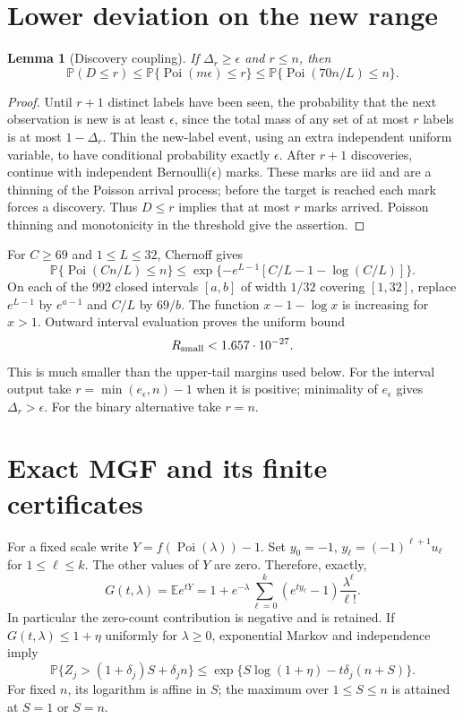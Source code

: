 \documentclass[11pt]{article}
\newtheorem{lemma}{Lemma}
\newcommand{\E}{\mathbb E}
\newcommand{\Prb}{\mathbb P}
\newcommand{\Poi}{\operatorname{Poi}}
\begin{document}
\section{Lower deviation on the new range}
\begin{lemma}[Discovery coupling]\label{lem:discovery}
If $\Delta_r\ge\epsilon$ and $r\le n$, then
\[
 \Prb(D\le r)\le\Prb\{\Poi(m\epsilon)\le r\}
                 \le\Prb\{\Poi(70n/L)\le n\}.
\]
\end{lemma}
\begin{proof}
Until $r+1$ distinct labels have been seen, the probability that the next
observation is new is at least $\epsilon$, since the total mass of any
set of at most $r$ labels is at most $1-\Delta_r$.
Thin the new-label event, using an extra independent uniform variable,
to have conditional probability exactly $\epsilon$. After $r+1$
discoveries, continue with independent Bernoulli($\epsilon$) marks.
These marks are iid and are a thinning of the Poisson arrival process;
before the target is reached each mark forces a discovery.
Thus $D\le r$ implies that at most $r$ marks arrived. Poisson thinning
and monotonicity in the threshold give the assertion.
\end{proof}
For $C\ge69$ and $1\le L\le32$, Chernoff gives
\[
 \Prb\{\Poi(Cn/L)\le n\}
 \le\exp\{-e^{L-1}[C/L-1-\log(C/L)]\}.
\]
On each of the 992 closed intervals $[a,b]$ of width $1/32$ covering
$[1,32]$, replace $e^{L-1}$ by $e^{a-1}$ and $C/L$ by $69/b$.
The function $x-1-\log x$ is increasing for $x>1$.
Outward interval evaluation proves the uniform bound
\begin{equation}\label{eq:lower}
 R_{\rm small}<1.657\cdot10^{-27}.
\end{equation}
This is much smaller than the upper-tail margins used below. For the
interval output take $r=\min(e_\epsilon,n)-1$ when it is positive;
minimality of $e_\epsilon$ gives $\Delta_r>\epsilon$.
For the binary alternative take $r=n$.

\section{Exact MGF and its finite certificates}
For a fixed scale write $Y=f(\Poi(\lambda))-1$. Set
$y_0=-1$, $y_\ell=(-1)^{\ell+1}u_\ell$ for $1\le\ell\le k$.
The other values of $Y$ are zero. Therefore, exactly,
\begin{equation}\label{eq:mgf}
 G(t,\lambda)=\E e^{tY}
 =1+e^{-\lambda}\sum_{\ell=0}^k(e^{ty_\ell}-1)
                                  \frac{\lambda^\ell}{\ell!}.
\end{equation}
In particular the zero-count contribution is negative and is retained.
If $G(t,\lambda)\le1+\eta$ uniformly for $\lambda\ge0$, exponential
Markov and independence imply
\begin{equation}\label{eq:chernoff}
 \Prb\{Z_j>(1+\delta_j)S+\delta_jn\}
 \le\exp\{S\log(1+\eta)-t\delta_j(n+S)\}.
\end{equation}
For fixed $n$, its logarithm is affine in $S$; the maximum over
$1\le S\le n$ is attained at $S=1$ or $S=n$.
\end{document}
